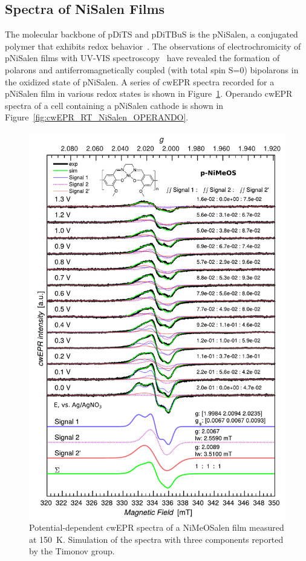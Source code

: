 \subsection{Spectra of NiSalen Films}
The molecular backbone of pDiTS and pDiTBuS is the pNiSalen, a conjugated polymer that exhibits redox behavior~\cite{Dmitrieva2018,Vereshchagin2020,Apraksin2021}. The observations of electrochromicity of pNiSalen films with UV-VIS spectroscopy~\cite{Dmitrieva2018} have revealed the formation of polarons and antiferromagnetically coupled (with total spin S=0) bipolarons in the oxidized state of pNiSalen. A series of cwEPR spectra recorded for a pNiSalen film in various redox states is shown in Figure~\ref{fig:cwEPR_CRYO_NiSalen_REDOX_SIM}. Operando cwEPR spectra of a cell containing a pNiSalen cathode is shown in Figure~\ref{fig:cwEPR_RT_NiSalen_OPERANDO}.

\begin{figure}[!h]
\center
	\includegraphics[width=1\textwidth]{./operando_epr/figures/CRYO/Figure_S8.pdf}
	\caption{Potential-dependent cwEPR spectra of a NiMeOSalen film measured at 150~K. Simulation of the spectra with three components reported by the Timonov group.}
	\label{fig:cwEPR_CRYO_NiSalen_REDOX_SIM}
\end{figure}

